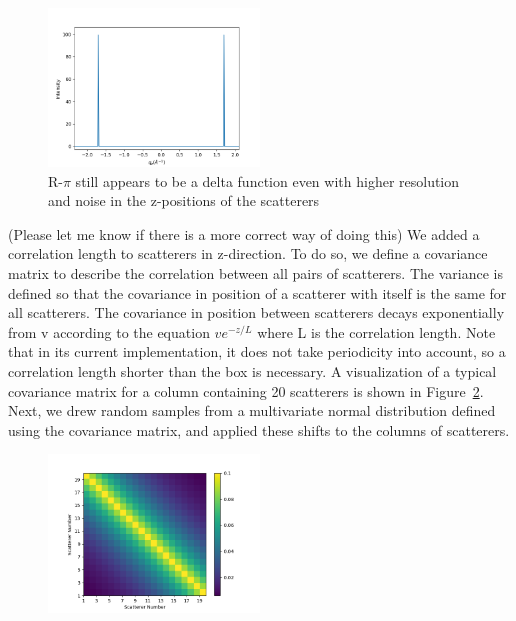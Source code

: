 \documentclass{article}
\begin{document}
  \begin{figure}[!htb]
  \centering
  \includegraphics[width=0.5\textwidth]{tall_rpi.png}
  \caption{R-$\pi$ still appears to be a delta function even with higher resolution and
  noise in the z-positions of the scatterers}\label{fig:tall_rpi}
  \end{figure}

  (Please let me know if there is a more correct way of doing this)
  We added a correlation length to scatterers in z-direction. To do so, we
  define a covariance matrix to describe the correlation between all pairs of
  scatterers. The variance is defined so that the covariance in position of
  a scatterer with itself is the same for all scatterers. The covariance in
  position between scatterers decays exponentially from v according to the
  equation $ve^{-z/L}$ where L is the correlation length. Note that in its
  current implementation, it does not take periodicity into account, so a
  correlation length shorter than the box is necessary. A visualization of a
  typical covariance matrix for a column containing 20 scatterers is shown in
  Figure~\ref{fig:covariance}. Next, we drew random samples from a multivariate
  normal distribution defined using the covariance matrix, and applied these
  shifts to the columns of scatterers.

  \begin{figure}[!htb]
  \centering
  \includegraphics[width=0.5\textwidth]{covariance.png}
  \caption{}\label{fig:covariance}
  \end{figure}
\end{document}
